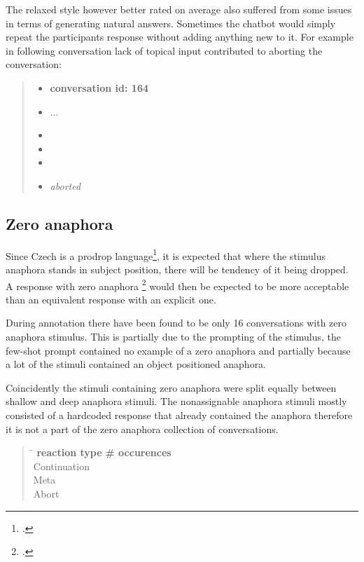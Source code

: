 The relaxed style however better rated on average also suffered from some issues
in terms of generating natural answers.
Sometimes the chatbot would simply repeat the participants response without adding anything new to it.
For example in following conversation lack of topical input contributed to aborting the conversation:

\begin{quote}
\begin{itemize}[label={}, leftmargin=0pt, itemsep=0.5em]
\item \textbf{conversation id: 164}
\item ...
\item {}
\item {}
\item {}
\item \textit{aborted}
\end{itemize}
\end{quote}


\subsection{Zero anaphora}

Since Czech is a prodrop language\footcite{pevskova2019slavic},
it is expected that where the stimulus anaphora stands in subject position,
there will be tendency of it being dropped.
A response with zero anaphora \footcite{zero} would then be expected to be more acceptable
than an equivalent response with an explicit one.

During annotation there have been found to be only 16 conversations with zero anaphora stimulus.
This is partially due to the prompting of the stimulus,
the few-shot prompt contained no example of a zero anaphora and
partially because a lot of the stimuli contained an object positioned anaphora.

Coincidently the stimuli containing zero anaphora were split equally between shallow and deep anaphora stimuli.
The nonassignable anaphora stimuli mostly consisted of a hardcoded response that already contained the anaphora
therefore it is not a part of the zero anaphora collection of conversations.

\begin{quote}
\begin{tabbing}
\hspace{4cm} \= \hspace{3cm} \kill %
\textbf{reaction type} \> \textbf{\# occurences}\\
Continuation  \\
Meta  \\
Abort   \\
\end{tabbing}
\end{quote}

